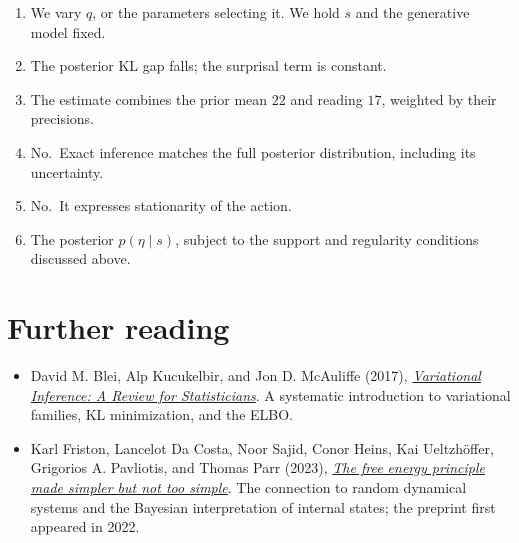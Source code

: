 \documentclass[
  letterpaper,
  DIV=11,
  numbers=noendperiod]{scrreprt}
\providecommand{\tightlist}{%
  \setlength{\itemsep}{0pt}\setlength{\parskip}{0pt}}
\begin{document}
\begin{tcolorbox}[enhanced jigsaw, arc=.35mm, bottomrule=.15mm, bottomtitle=1mm, breakable, colback=white, colbacktitle=quarto-callout-note-color!10!white, colframe=quarto-callout-note-color-frame, coltitle=black, left=2mm, leftrule=.75mm, opacityback=0, opacitybacktitle=0.6, rightrule=.15mm, title=\textcolor{quarto-callout-note-color}{\faInfo}\hspace{0.5em}{Suggested answers}, titlerule=0mm, toprule=.15mm, toptitle=1mm]

\begin{enumerate}
\def\labelenumi{\arabic{enumi}.}
\tightlist
\item
  We vary \(q\), or the parameters selecting it. We hold \(s\) and the
  generative model fixed.
\item
  The posterior KL gap falls; the surprisal term is constant.
\item
  The estimate combines the prior mean \(22\) and reading \(17\),
  weighted by their precisions.
\item
  No.~Exact inference matches the full posterior distribution, including
  its uncertainty.
\item
  No.~It expresses stationarity of the action.
\item
  The posterior \(p(\eta\mid s)\), subject to the support and regularity
  conditions discussed above.
\end{enumerate}

\end{tcolorbox}

\section*{Further reading}\label{further-reading}


\begin{itemize}
\tightlist
\item
  David M. Blei, Alp Kucukelbir, and Jon D. McAuliffe (2017),
  \href{https://arxiv.org/abs/1601.00670}{\emph{Variational Inference: A
  Review for Statisticians}}. A systematic introduction to variational
  families, KL minimization, and the ELBO.
\item
  Karl Friston, Lancelot Da Costa, Noor Sajid, Conor Heins, Kai
  Ueltzhöffer, Grigorios A. Pavliotis, and Thomas Parr (2023),
  \href{https://arxiv.org/abs/2201.06387}{\emph{The free energy
  principle made simpler but not too simple}}. The connection to random
  dynamical systems and the Bayesian interpretation of internal states;
  the preprint first appeared in 2022.
\end{itemize}
\end{document}
